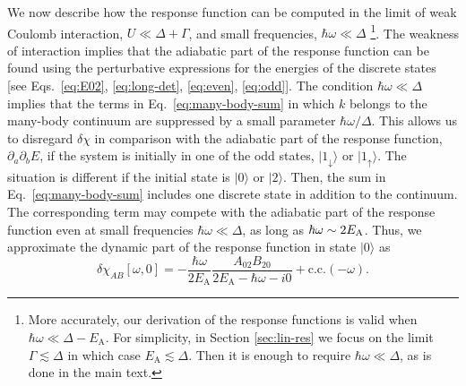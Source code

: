 \documentclass[aps,reprint,longbibliography, prb]{revtex4-2}
\begin{document}
We now describe how the response function can be computed in the limit of weak Coulomb interaction, $U \ll \Delta + \Gamma$, and small frequencies, $\hbar\omega \ll \Delta$ \footnote{More accurately, our derivation of the response functions is valid when $\hbar\omega \ll \Delta - E_\mathrm{A}$. For simplicity, in Section \ref{sec:lin-res} we focus on the limit $\Gamma \lesssim \Delta$ in which case $E_\mathrm{A} \lesssim \Delta$. Then it is enough to require $\hbar\omega\ll \Delta$, as is done in the main text.}. The weakness of interaction implies that the adiabatic part of the response function can be found using the perturbative expressions for the energies of the discrete states [see Eqs.~\eqref{eq:E02}, \eqref{eq:long-det}, \eqref{eq:even}, \eqref{eq:odd}].
The condition $\hbar\omega \ll \Delta$ implies that the terms in Eq.~\eqref{eq:many-body-sum} in which $k$ belongs to the many-body continuum are suppressed by a small parameter $\hbar\omega/\Delta$. This allows us to disregard $\delta\chi$ in comparison with the adiabatic part of the response function, $\partial_a\partial_b E$, if the system is initially in one of the odd states, $|1_\downarrow\rangle$ or $|1_\uparrow\rangle$.
The situation is different if the initial state is $|0\rangle$ or $|2\rangle$. Then, the sum in Eq.~\eqref{eq:many-body-sum} includes one discrete state in addition to the continuum.
The corresponding term may compete with the adiabatic part of the response function even at small frequencies $\hbar\omega \ll \Delta$, as long as $\hbar\omega \sim 2E_{\rm A}$.
Thus, we approximate the dynamic part of the response function in state $|0\rangle$ as
\begin{equation}
    \label{eq:Kubo}
    \delta\chi_{AB}[\omega,0] = -\frac{\hbar\omega}{2E_\mathrm{A}}\frac{A_{02}B_{20}}{2E_\mathrm{A}-\hbar\omega-i0} + \mathrm{c.c.}(-\omega).
\end{equation}
\end{document}
